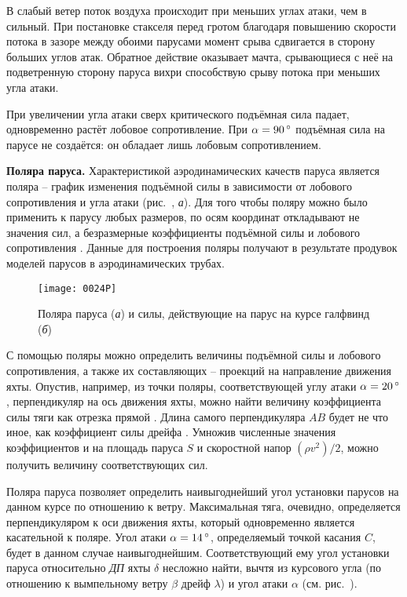 В слабый ветер поток воздуха происходит при меньших углах атаки, чем в сильный. При постановке стакселя перед гротом благодаря повышению скорости потока в зазоре между обоими парусами момент срыва сдвигается в сторону больших углов атак. Обратное действие оказывает мачта, срывающиеся с неё на подветренную сторону паруса вихри способствую срыву потока при меньших угла атаки. 

При увеличении угла атаки сверх критического подъёмная сила падает, одновременно растёт лобовое сопротивление. При $\alpha = 90\,^\circ$ подъёмная сила на парусе не создаётся: он обладает лишь лобовым сопротивлением.

\textbf{Поляра паруса.}
Характеристикой аэродинамических качеств паруса является поляра \---
график изменения подъёмной силы в зависимости от лобового
сопротивления и угла атаки (рис.~, \textit{а}). Для того чтобы
поляру можно было применить к парусу любых размеров, по осям координат
откладывают не значения сил, а безразмерные коэффициенты подъёмной
силы  и лобового сопротивления . Данные для
построения поляры получают в результате продувок моделей парусов в
аэродинамических трубах.

\begin{figure}[!htb]
  \centering
  \texttt{[image: 0024P]}
  \caption{Поляра паруса (\textit{а}) и силы, действующие на парус на курсе галфвинд (\textit{б})}
  \label{fig:24}
\end{figure}

С помощью поляры можно определить величины подъёмной силы и лобового
сопротивления, а также их составляющих \--- проекций на направление
движения яхты. Опустив, например, из точки поляры, соответствующей
углу атаки $\alpha = 20\,^\circ$, перпендикуляр на ось движения яхты, можно
найти величину коэффициента силы тяги  как отрезка прямой
. Длина самого перпендикуляра $AB$ будет не что иное, как
коэффициент силы дрейфа . Умножив численные значения
коэффициентов  и  на площадь паруса $S$ и
скоростной напор $(\rho v^2)/2$, можно получить величину
соответствующих сил.

Поляра паруса позволяет определить наивыгоднейший угол установки
парусов на данном курсе по отношению к ветру. Максимальная тяга,
очевидно, определяется перпендикуляром к оси движения яхты, который
одновременно является касательной к поляре. Угол атаки
$\alpha = 14\,^\circ$, определяемый точкой касания $C$, будет в данном
случае наивыгоднейшим. Соответствующий ему угол установки паруса
относительно \textit{ДП} яхты $\delta$ несложно найти, вычтя из
курсового угла (по отношению к вымпельному ветру $\beta$ дрейф
$\lambda$) и угол атаки $\alpha$ (см. рис.~).

